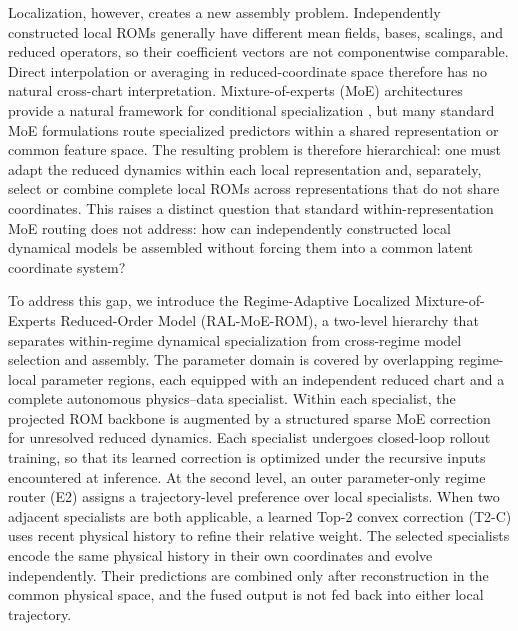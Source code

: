 Localization, however, creates a new assembly problem. Independently constructed local ROMs generally have different mean fields, bases, scalings, and reduced operators, so their coefficient vectors are not componentwise comparable. Direct interpolation or averaging in reduced-coordinate space therefore has no natural cross-chart interpretation. Mixture-of-experts (MoE) architectures provide a natural framework for conditional specialization \citep{jacobs1991,jordan1994,shazeer2017,fedus2022}, but many standard MoE formulations route specialized predictors within a shared representation or common feature space. The resulting problem is therefore hierarchical: one must adapt the reduced dynamics within each local representation and, separately, select or combine complete local ROMs across representations that do not share coordinates. This raises a distinct question that standard within-representation MoE routing does not address: how can independently constructed local dynamical models be assembled without forcing them into a common latent coordinate system?


To address this gap, we introduce the Regime-Adaptive Localized Mixture-of-Experts Reduced-Order Model (RAL-MoE-ROM), a two-level hierarchy that separates within-regime dynamical specialization from cross-regime model selection and assembly. The parameter domain is covered by overlapping regime-local parameter regions, each equipped with an independent reduced chart and a complete autonomous physics--data specialist. Within each specialist, the projected ROM backbone is augmented by a structured sparse MoE correction for unresolved reduced dynamics. Each specialist undergoes closed-loop rollout training, so that its learned correction is optimized under the recursive inputs encountered at inference. At the second level, an outer parameter-only regime router (E2) assigns a trajectory-level preference over local specialists. When two adjacent specialists are both applicable, a learned Top-2 convex correction (T2-C) uses recent physical history to refine their relative weight. The selected specialists encode the same physical history in their own coordinates and evolve independently. Their predictions are combined only after reconstruction in the common physical space, and the fused output is not fed back into either local trajectory.


